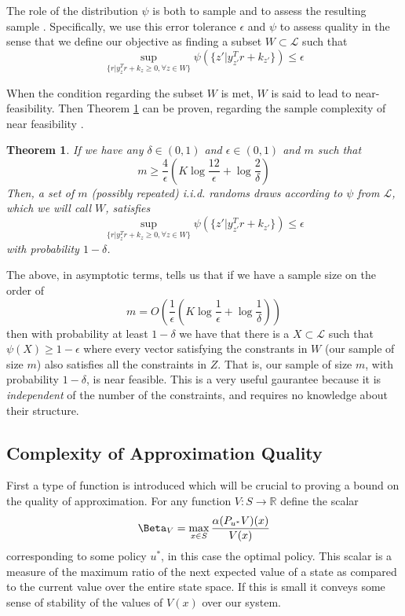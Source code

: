 \documentclass[12pt,reqno]{amsart}
\newtheorem{thm}{Theorem}[section]
\newcommand{\R}{\ensuremath{\mathbb{R}}}
\newcommand{\sL}{\mathcal{L}}
\numberwithin{equation}{section}
\begin{document}
The role of the distribution $\psi$ is both to sample and to assess the resulting sample \cite{FV2}. Specifically, we use this error tolerance $\epsilon$ and $\psi$ to assess quality in the sense that we define our objective as finding a subset $W \subset \sL$ such that
$$
\sup_{\{r | y_z^Tr + k_z \geq 0, \forall z \in W\}} \psi(\{ z' | y_{z'}^T r + k_{z'}\}) \leq \epsilon
$$

When the condition regarding the subset $W$ is met, $W$ is said to lead to near-feasibility. Then Theorem \ref{thm:sample_complexity} can be proven, regarding the sample complexity of near feasibility \cite{FV2}.

\begin{thm}\label{thm:sample_complexity}
If we have any $\delta \in (0,1)$ and $\epsilon \in (0,1)$ and $m$ such that
$$
m \geq \frac{4}{\epsilon} (K \log \frac{12}{\epsilon} + \log \frac{2}{\delta})
$$
Then, a set of $m$ (possibly repeated) i.i.d. randoms draws according to $\psi$ from $\sL$, which we will call $W$, satisfies
$$
\sup_{\{r | y_z^Tr + k_z \geq 0, \forall z \in W\}} \psi(\{ z' | y_{z'}^T r + k_{z'}\}) \leq \epsilon
$$ 
with probability $1-\delta$.
\end{thm}

The above, in asymptotic terms, tells us that if we have a sample size on the order of
$$
m = O(\frac{1}{\epsilon}(K \log \frac{1}{\epsilon} + \log \frac{1}{\delta}))
$$
then with probability at least $1-\delta$ we have that there is a $X \subset \sL$ such that $\psi(X) \geq 1 - \epsilon$ where every vector satisfying the constrants in $W$ (our sample of size $m$) also satisfies all the constraints in $Z$. That is, our sample of size $m$, with probability $1- \delta$, is near feasible. This is a very useful gaurantee because it is {\em independent} of the number of the constraints, and requires no knowledge about their structure.

\subsection{Complexity of Approximation Quality}
First a type of function is introduced which will be crucial to proving a bound on the quality of approximation. For any function $V: S \rightarrow \R$ define the scalar
$$
\Beta_V = \max_{x \in S} \frac{\alpha(P_{u^*}V)(x)}{V(x)}
$$
corresponding to some policy $u^*$, in this case the optimal policy. This scalar is a measure of the maximum ratio of the next expected value of a state as compared to the current value over the entire state space. If this is small it conveys some sense of stability of the values of $V(x)$ over our system.
\end{document}
